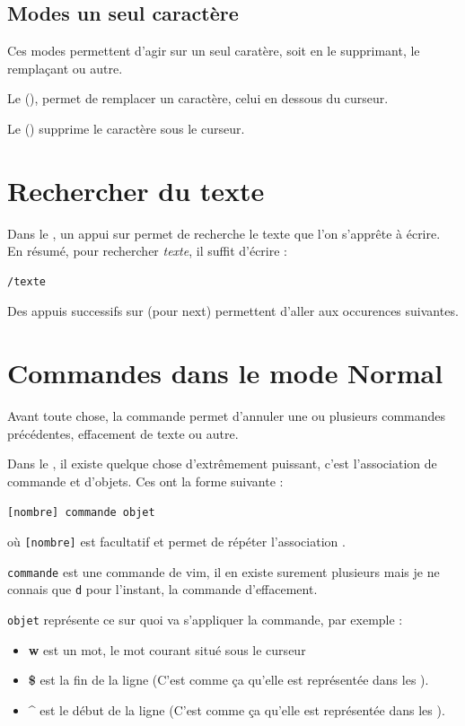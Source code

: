 \documentclass[a4paper,twoside]{article}
\begin{document}
\subsection{Modes \og un seul caractère\fg}
\begin{remarque}
Ces modes permettent d'agir sur un seul caratère, soit en le supprimant, le remplaçant ou autre.
\end{remarque}

Le  (), permet de remplacer un caractère, celui en dessous du curseur.

Le  () supprime le caractère sous le curseur.


\section{Rechercher du texte}
Dans le , un appui sur \touche{/} permet de recherche le texte que l'on s'apprête à écrire. En résumé, pour rechercher \emph{texte}, il suffit d'écrire :
\begin{verbatim}
/texte
\end{verbatim}
Des appuis successifs sur  (pour next) permettent d'aller aux occurences suivantes.

\section{Commandes dans le mode Normal}
Avant toute chose, la commande  permet d'annuler une ou plusieurs commandes précédentes, effacement de texte ou autre.

\bigskip

Dans le , il existe quelque chose d'extrêmement puissant, c'est l'association de commande et d'objets. Ces  ont la forme suivante :
\begin{verbatim}
[nombre] commande objet
\end{verbatim}
où \verb|[nombre]| est facultatif et permet de répéter l'association .

\texttt{commande} est une commande de vim, il en existe surement plusieurs mais je ne connais que \texttt{d} pour l'instant, la commande d'effacement.

\texttt{objet} représente ce sur quoi va s'appliquer la commande, par exemple :
\begin{itemize}
\item\textbf{w} est un mot, le mot courant situé sous le curseur
\item\textbf{\$} est la fin de la ligne (C'est comme ça qu'elle est représentée dans les ).
\item\textbf{\^} est le début de la ligne (C'est comme ça qu'elle est représentée dans les ).
\end{itemize}
\end{document}
